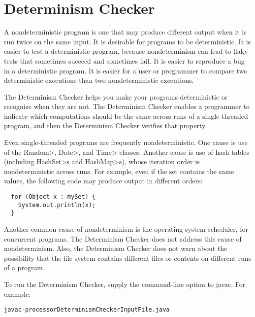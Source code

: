 \htmlhr
\chapter{Determinism Checker\label{determinism-checker}}

A nondeterministic program is one that may produce different output when
it is run twice on the same input.
It is desirable for programs to be deterministic.
It is easier to test a deterministic program, because nondeterminism can
lead to flaky tests that sometimes succeed and sometimes fail.
It is easier to reproduce a bug in a deterministic program.
It is easier for a user or programmer to compare two
deterministic executions than two nondeterministic executions.

The Determinism Checker helps you make your programs deterministic or
recognize when they are not.
The Determinism Checker enables a programmer to indicate which
computations should be the same across runs of a single-threaded program,
and then the Determinism Checker verifies that property.

Even single-threaded programs are frequently nondeterministic.
One cause is use of the \<Random>, \<Date>, and \<Time> classes.
Another cause is use of hash tables (including \<HashSet>s and
\<HashMap>s), whose iteration order is nondeterministic across runs.
For example, even if the set contains the same values, the following code
may produce output in different orders:

\begin{Verbatim}
  for (Object x : mySet) {
    System.out.println(x);
  }
\end{Verbatim}

Another common cause of nondeterminism is the operating system scheduler,
for concurrent programs.  The Determinism Checker does not address this
cause of nondeterminism.  Also, the Determinism Checker does not warn
about the possibility that the file system contains different files or
contents on different runs of a program.

To run the Determinism Checker, supply the
command-line option to javac.
For example:

\begin{alltt}
  javac -processor DeterminismChecker InputFile.java
\end{alltt}




